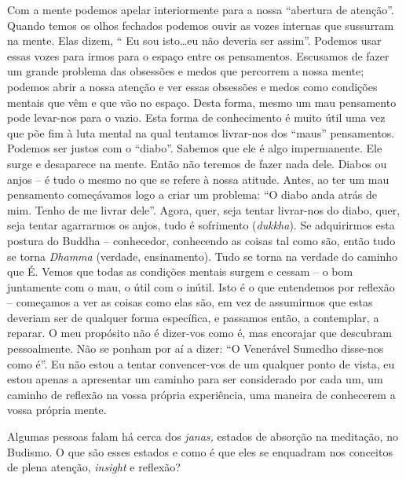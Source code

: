 Com a mente podemos apelar interiormente para a nossa ``abertura de
atenção''. Quando temos os olhos fechados podemos ouvir as vozes
internas que sussurram na mente. Elas dizem, `` Eu sou isto\ldots{}eu não
deveria ser assim''. Podemos usar essas vozes para irmos para o espaço
entre os pensamentos. Escusamos de fazer um grande problema das
obsessões e medos que percorrem a nossa mente; podemos abrir a nossa
atenção e ver essas obsessões e medos como condições mentais que vêm e
que vão no espaço. Desta forma, mesmo um mau pensamento pode levar-nos
para o vazio. Esta forma de conhecimento é muito útil uma vez que põe
fim à luta mental na qual tentamos livrar-nos dos ``maus'' pensamentos.
Podemos ser justos com o ``diabo''. Sabemos que ele é algo impermanente.
Ele surge e desaparece na mente. Então não teremos de fazer nada dele.
Diabos ou anjos -- é tudo o mesmo no que se refere à nossa atitude.
Antes, ao ter um mau pensamento começávamos logo a criar um problema:
``O diabo anda atrás de mim. Tenho de me livrar dele''. Agora, quer,
seja tentar livrar-nos do diabo, quer, seja tentar agarrarmos os anjos,
tudo é sofrimento (\emph{dukkha}). Se adquirirmos esta postura do Buddha
-- conhecedor, conhecendo as coisas tal como são, então tudo se torna
\emph{Dhamma} (verdade, ensinamento). Tudo se torna na verdade do
caminho que É. Vemos que todas as condições mentais surgem e cessam -- o
bom juntamente com o mau, o útil com o inútil. Isto é o que entendemos
por reflexão -- começamos a ver as coisas como elas são, em vez de
assumirmos que estas deveriam ser de qualquer forma específica, e
passamos então, a contemplar, a reparar. O meu propósito não é dizer-vos
como é, mas encorajar que descubram pessoalmente. Não se ponham por aí a
dizer: ``O Venerável Sumedho disse-nos como é''. Eu não estou a tentar
convencer-vos de um qualquer ponto de vista, eu estou apenas a
apresentar um caminho para ser considerado por cada um, um caminho de
reflexão na vossa própria experiência, uma maneira de conhecerem a vossa
própria mente.

\bigskip

 Algumas pessoas falam há cerca dos \emph{janas,} estados de
absorção na meditação, no Budismo. O que são esses estados e como é que
eles se enquadram nos conceitos de plena atenção, \emph{insight} e
reflexão?

